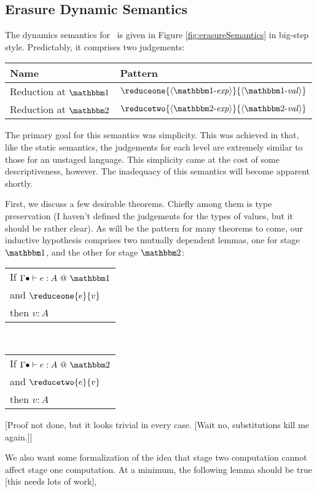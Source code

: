 \documentclass{article}
\begin{document}
\subsection{Erasure Dynamic Semantics}

The dynamics semantics for \ellStaged~is given in Figure \ref{fig:erasureSemantics} in big-step style.  Predictably, it comprises two judgements:

\begin{center}
\begin{tabular}{|l|l|} \hline
Name & Pattern \\ \hline
Reduction at $\bbone$ & $\reduceone{\expro}{\valo}$ \\  \hline
Reduction at $\bbtwo$ & $\reducetwo{\exprt}{\valt}$ \\ \hline
\end{tabular}
\end{center}

The primary goal for this semantics was simplicity.  This was achieved in that, like the static semantics, the judgements for each level are extremely similar to those for an unstaged language.  This simplicity came at the cost of some descriptiveness, however.  The inadequacy of this semantics will become apparent shortly.

First, we discuss a few desirable theorems.  Chiefly among them is type preservation (I haven't defined the judgements for the types of values, but it should be rather clear).  As will be the pattern for many theorems to come, our inductive hypothesis comprises two mutually dependent lemmas, one for stage $\bbone$, and the other for stage $\bbtwo$:
\begin{center}
\begin{tabular}{l}
If $\typesone [\emptyC]{e}{A}$ \\
and $\reduceone{e}{v}$ \\
then $v : A$
\end{tabular}
~~~
\begin{tabular}{l}
If $\typestwo [\emptyC]{e}{A}$ \\
and $\reducetwo{e}{v}$ \\
then $v : A$
\end{tabular}
\end{center}
[Proof not done, but it looks trivial in every case. [Wait no, substitutions kill me again.]]

We also want some formalization of the idea that stage two computation cannot affect stage one computation.  At a minimum, the following lemma should be true [this needs lots of work],
\end{document}
